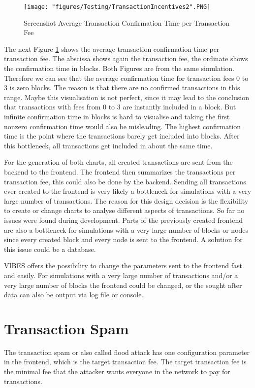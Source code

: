 \begin{figure}[!htb]
\centering
\texttt{[image: "figures/Testing/TransactionIncentives2".PNG]}
\caption{Screenshot Average Transaction Confirmation Time per Transaction Fee
\label{fig:TransactionIncentives2}}
\end{figure}

The next Figure \ref{fig:TransactionIncentives2} shows the average transaction confirmation time per transaction fee. The abscissa shows again the transaction fee, the ordinate shows the confirmation time in blocks. Both Figures are from the same simulation. Therefore we can see that the average confirmation time for transaction fees 0 to 3 is zero blocks. The reason is that there are no confirmed transactions in this range. Maybe this visualisation is not perfect, since it may lead to the conclusion that transactions with fees from 0 to 3 are instantly included in a block. But infinite confirmation time in blocks is hard to visualise and taking the first nonzero confirmation time would also be misleading. The highest confirmation time is the point where the transactions barely get included into blocks. After this bottleneck, all transactions get included in about the same time.

For the generation of both charts, all created transactions are sent from the backend to the frontend. The frontend then summarizes the transactions per transaction fee, this could also be done by the backend. Sending all transactions ever created to the frontend is very likely a bottleneck for simulations with a very large number of transactions. The reason for this design decision is the flexibility to create or change charts to analyse different aspects of transactions. So far no issues were found during development. Parts of the previously created frontend are also a bottleneck for simulations with a very large number of blocks or nodes since every created block and every node is sent to the frontend. A solution for this issue could be a database.

VIBES offers the possibility to change the parameters sent to the frontend fast and easily. For simulations with a very large number of transactions and/or a very large number of blocks the frontend could be changed, or the sought after data can also be output via log file or console.

\section{Transaction Spam}
The transaction spam or also called flood attack has one configuration parameter in the frontend, which is the target transaction fee. The target transaction fee is the minimal fee that the attacker wants everyone in the network to pay for transactions.

